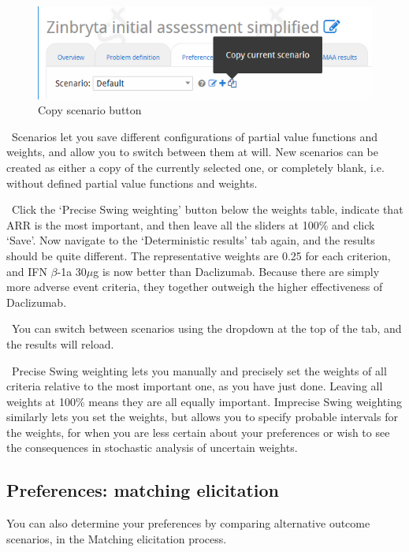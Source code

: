 \documentclass[00_mcda_tutorial.tex]{subfiles}
\begin{document}
\begin{figure}[!h]
    \centering
	\includegraphics[width=.5\textwidth]{fig/copyScenario.png}
    \caption{Copy scenario button}
	\label{fig:copy_scenario}
\end{figure}

\noindent \faGraduationCap \, Scenarios let you save different configurations of partial value functions and weights, and allow you to switch between them at will. New scenarios can be created as either a copy of the currently selected one, or completely blank, i.e. without defined partial value functions  and weights.
\newline

\noindent \leftpointright \, Click the ‘Precise Swing weighting’ button below the weights table, indicate that ARR is the most important, and then leave all the sliders at 100\% and click ‘Save’. Now navigate to the ‘Deterministic results’ tab again, and the results should be quite different. The representative weights are 0.25 for each criterion, and IFN $\beta$-1a 30$\mu$g is now better than Daclizumab. Because there are simply more adverse event criteria, they together outweigh the higher effectiveness of Daclizumab.
\newline

\noindent \faLightbulbO \, You can switch between scenarios using the dropdown at the top of the tab, and the results will reload.
\newline

\noindent \faGraduationCap \, Precise Swing weighting lets you manually and precisely set the weights of all criteria relative to the most important one, as you have just done. Leaving all weights at 100\% means they are all equally important. Imprecise Swing weighting similarly lets you set the weights, but allows you to specify probable intervals for the weights, for when you are less certain about your preferences or wish to see the consequences in stochastic analysis of uncertain weights.

\subsection*{Preferences: matching elicitation}
You can also determine your preferences by comparing alternative outcome scenarios, in the Matching elicitation process.
\newline
\end{document}
